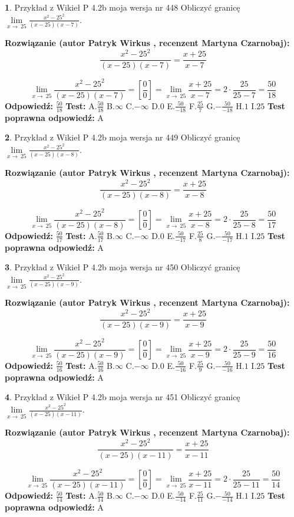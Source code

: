 \documentclass[12pt, a4paper]{article}
\theoremstyle{definition} %
\newtheorem{zad}{}
\newcommand{\zadStart}[1]{\begin{zad}#1\newline}
\newcommand{\zadStop}{\end{zad}}
\newcommand{\rozwStart}[2]{\noindent \textbf{Rozwiązanie (autor #1 , recenzent #2): }\newline}
\newcommand{\rozwStop}{\newline}
\newcommand{\odpStart}{\noindent \textbf{Odpowiedź:}\newline}
\newcommand{\odpStop}{\newline}
\newcommand{\testStart}{\noindent \textbf{Test:}\newline}
\newcommand{\testStop}{\newline}
\newcommand{\kluczStart}{\noindent \textbf{Test poprawna odpowiedź:}\newline}
\newcommand{\kluczStop}{\newline}
\begin{document}
\zadStart{Przykład z Wikieł P 4.2b moja wersja nr 448}
Obliczyć granicę $\lim\limits_{x\to\ 25}\frac{x^{2}-25^{2}}{(x-25)(x-7)}$.
\zadStop
\rozwStart{Patryk Wirkus}{Martyna Czarnobaj}
$$\frac{x^{2}-25^{2}}{(x-25)(x-7)}=\frac{x+25}{x-7}$$

$$\lim\limits_{x\to\ 25}\frac{x^{2}-25^{2}}{(x-25)(x-7)}=[\frac{0}{0}]=\lim\limits_{x\to\ 25}\frac{x+25}{x-7}=2 \cdot \frac{25}{25-7} = \frac{50}{18}$$
\rozwStop
\odpStart
$\frac{50}{18}$
\odpStop
\testStart
A.$\frac{50}{18}$
B.$\infty$
C.$-\infty$
D.$0$
E.$\frac{50}{-18}$
F.$\frac{25}{7}$
G.$-\frac{50}{-18}$
H.$1$
I.$25$
\testStop
\kluczStart
A
\kluczStop



\zadStart{Przykład z Wikieł P 4.2b moja wersja nr 449}
Obliczyć granicę $\lim\limits_{x\to\ 25}\frac{x^{2}-25^{2}}{(x-25)(x-8)}$.
\zadStop
\rozwStart{Patryk Wirkus}{Martyna Czarnobaj}
$$\frac{x^{2}-25^{2}}{(x-25)(x-8)}=\frac{x+25}{x-8}$$

$$\lim\limits_{x\to\ 25}\frac{x^{2}-25^{2}}{(x-25)(x-8)}=[\frac{0}{0}]=\lim\limits_{x\to\ 25}\frac{x+25}{x-8}=2 \cdot \frac{25}{25-8} = \frac{50}{17}$$
\rozwStop
\odpStart
$\frac{50}{17}$
\odpStop
\testStart
A.$\frac{50}{17}$
B.$\infty$
C.$-\infty$
D.$0$
E.$\frac{50}{-17}$
F.$\frac{25}{8}$
G.$-\frac{50}{-17}$
H.$1$
I.$25$
\testStop
\kluczStart
A
\kluczStop



\zadStart{Przykład z Wikieł P 4.2b moja wersja nr 450}
Obliczyć granicę $\lim\limits_{x\to\ 25}\frac{x^{2}-25^{2}}{(x-25)(x-9)}$.
\zadStop
\rozwStart{Patryk Wirkus}{Martyna Czarnobaj}
$$\frac{x^{2}-25^{2}}{(x-25)(x-9)}=\frac{x+25}{x-9}$$

$$\lim\limits_{x\to\ 25}\frac{x^{2}-25^{2}}{(x-25)(x-9)}=[\frac{0}{0}]=\lim\limits_{x\to\ 25}\frac{x+25}{x-9}=2 \cdot \frac{25}{25-9} = \frac{50}{16}$$
\rozwStop
\odpStart
$\frac{50}{16}$
\odpStop
\testStart
A.$\frac{50}{16}$
B.$\infty$
C.$-\infty$
D.$0$
E.$\frac{50}{-16}$
F.$\frac{25}{9}$
G.$-\frac{50}{-16}$
H.$1$
I.$25$
\testStop
\kluczStart
A
\kluczStop



\zadStart{Przykład z Wikieł P 4.2b moja wersja nr 451}
Obliczyć granicę $\lim\limits_{x\to\ 25}\frac{x^{2}-25^{2}}{(x-25)(x-11)}$.
\zadStop
\rozwStart{Patryk Wirkus}{Martyna Czarnobaj}
$$\frac{x^{2}-25^{2}}{(x-25)(x-11)}=\frac{x+25}{x-11}$$

$$\lim\limits_{x\to\ 25}\frac{x^{2}-25^{2}}{(x-25)(x-11)}=[\frac{0}{0}]=\lim\limits_{x\to\ 25}\frac{x+25}{x-11}=2 \cdot \frac{25}{25-11} = \frac{50}{14}$$
\rozwStop
\odpStart
$\frac{50}{14}$
\odpStop
\testStart
A.$\frac{50}{14}$
B.$\infty$
C.$-\infty$
D.$0$
E.$\frac{50}{-14}$
F.$\frac{25}{11}$
G.$-\frac{50}{-14}$
H.$1$
I.$25$
\testStop
\kluczStart
A
\kluczStop
\end{document}
